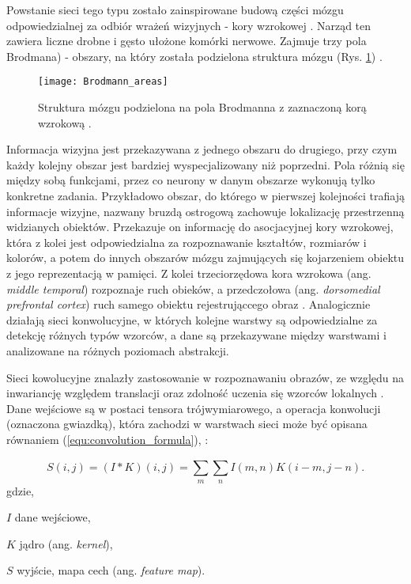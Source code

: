 {\parindent0pt %
Powstanie sieci tego typu zostało zainspirowane budową części mózgu odpowiedzialnej za odbiór wrażeń wizyjnych - kory wzrokowej \cite{Matsugu2003SubjectIF}. Narząd ten zawiera liczne drobne i gęsto ułożone komórki nerwowe. Zajmuje trzy pola Brodmana) - obszary, na który została podzielona struktura mózgu (Rys. \ref{fig:brodmann_areas}) \cite{Brodmann1985VergleichendeLD}. 

\begin{figure}[h]
	\centering
	\centering
		\texttt{[image: Brodmann\_areas]}	
	\caption{Struktura mózgu podzielona na pola Brodmanna z zaznaczoną korą wzrokową \cite{brodmann_areas}.}
	\label{fig:brodmann_areas}
\end{figure}

Informacja wizyjna jest przekazywana z jednego obszaru do drugiego, przy czym każdy kolejny obszar jest bardziej wyspecjalizowany niż poprzedni. Pola różnią się między sobą funkcjami, przez co neurony w danym obszarze wykonują tylko konkretne zadania. Przykładowo obszar, do którego w pierwszej kolejności trafiają informacje wizyjne, nazwany bruzdą ostrogową zachowuje lokalizację przestrzenną widzianych obiektów. Przekazuje on informację do asocjacyjnej kory wzrokowej, która z kolei jest odpowiedzialna za rozpoznawanie kształtów, rozmiarów i kolorów, a potem do innych obszarów mózgu zajmujących się kojarzeniem obiektu z jego reprezentacją w pamięci. Z kolei trzeciorzędowa kora wzrokowa (ang. \textit{middle temporal}) rozpoznaje ruch obieków, a przedczołowa (ang. \textit{dorsomedial prefrontal cortex}) ruch samego obiektu rejestrująccego obraz \cite{cnn_website}. Analogicznie działają sieci konwolucyjne, w których kolejne warstwy są odpowiedzialne za detekcję różnych typów wzorców, a dane są przekazywane między warstwami i analizowane na różnych poziomach abstrakcji.

Sieci kowolucyjne znalazły zastosowanie w rozpoznawaniu obrazów, ze względu na inwariancję względem translacji oraz zdolność uczenia się wzorców lokalnych \cite{Chollet2017DeepLW}. Dane wejściowe są w postaci tensora trójwymiarowego, a operacja konwolucji (oznaczona gwiazdką), która zachodzi w warstwach sieci może być opisana równaniem (\ref{equ:convolution_formula}), \cite{deep_learning}:

\begin{equation}
S(i,j) = (I * K)(i,j) = \sum_{m}^{}\sum_{n}^{} I(m,n)K(i-m,j-n).
\label{equ:convolution_formula}
\end{equation}
gdzie,
\begin{eqwhere}[2cm]
	\item[$I$] dane wejściowe,
	\item[$K$] jądro (ang. \textit{kernel}),
	\item[$S$] wyjście, mapa cech (ang. \textit{feature map}).
\end{eqwhere}
}

